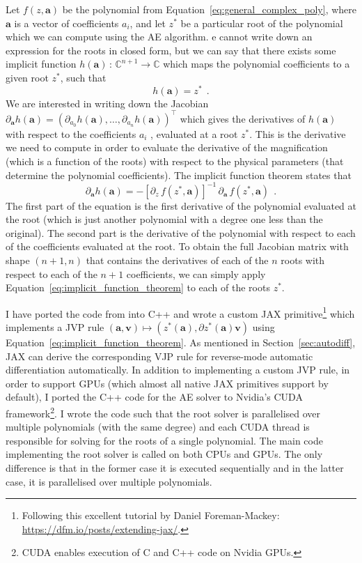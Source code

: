 \documentclass[12pt,dvipsnames]{report}
\newcommand{\ssf}[1]{\textsf{#1}}
\renewcommand{\vec}[1]{\boldsymbol{\mathbf{#1}}}
\newcommand{\hquad}{~~}
\begin{document}
Let $f(z, \vec{a})$ be the polynomial from Equation~\ref{eq:general_complex_poly}, where 
$\vec{a}$ is a vector of coefficients $a_i$, and let $z^*$ be a particular root of the 
polynomial which we can compute using the AE algorithm. e cannot write down an
expression for the roots in closed form, but we can say that there exists some
implicit function $h(\vec a)\,:\,\mathbb{C}^{n+1}\rightarrow\mathbb{C}$ which maps the 
polynomial coefficients to a given root $z^*$, such that
\begin{equation}
    h(\vec{a})=z^*
    \hquad .
\end{equation}
 We are interested in writing down the
Jacobian $\partial_{\vec a} h(\vec{a})=(\partial_{a_0} h(\vec a),\ldots,\partial_{a_n} h(\vec{a}))^\intercal$ 
which gives the derivatives of $h(\vec{a})$ with respect to the
coefficients $a_i$ , evaluated at a root $z^*$. This is the derivative we need 
to compute in order to evaluate the derivative of the magnification
(which is a function of the roots) with respect to the physical parameters
(that determine the polynomial coefficients). The implicit function theorem
states that
\begin{equation}
    \partial_{\vec a}h(\vec{a})=-\left[\partial_z\,f(z^*,\vec{a})\right]^{-1}\,\partial_{\vec a}\,f (z^*,\vec a) 
    \hquad .
    \label{eq:implicit_function_theorem}
\end{equation}
The first part of the equation is the first derivative of the polynomial evaluated at the
root (which is just another polynomial with a degree one less than the original).
The second part is the derivative of the polynomial with respect to each of the
coefficients evaluated at the root. To obtain the full Jacobian matrix  with shape 
$(n+1, n)$ that contains the  derivatives of each of the $n$ roots with respect to each of 
the $n+1$ coefficients, we can simply apply Equation~\ref{eq:implicit_function_theorem} 
to each of the roots $z^*$. 

I have ported the code from \citet{cameron2021} into \ssf{C++} and wrote a custom \ssf{JAX}
primitive\footnote{Following this excellent tutorial by Daniel Foreman-Mackey: 
\url{https://dfm.io/posts/extending-jax/}.} which implements a JVP rule 
$\left(\vec{a}, \vec v\right) \mapsto\left(z^{*}\left(\vec a\right), \partial z^{*}\left(\vec a\right) \vec v\right)$
using Equation~\ref{eq:implicit_function_theorem}. As mentioned
in Section~\ref{sec:autodiff}, \ssf{JAX} can derive the corresponding VJP rule for 
reverse-mode automatic differentiation automatically. In addition to implementing a 
custom JVP rule, in order to support GPUs (which almost all native \ssf{JAX} primitives 
support by default), I ported the \ssf{C++} code  for the AE solver to Nvidia's 
\ssf{CUDA} framework\footnote{\ssf{CUDA} enables execution 
of \ssf{C} and \ssf{C++} code on Nvidia GPUs.}. I wrote the code such that the root 
solver is parallelised over multiple polynomials (with the same degree) and each \ssf{CUDA} thread is 
responsible for solving for the roots of a single polynomial. The main code implementing the root solver is
called on both CPUs and GPUs.
The only difference is that in the former case it is 
executed sequentially and in the latter case, it is parallelised over multiple polynomials. 
\end{document}
